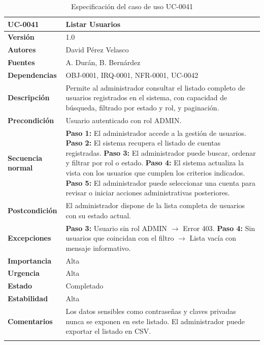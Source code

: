 \documentclass[11pt, a4paper]{article}
\begin{document}
\begin{longtable}{|p{4cm}|p{10cm}|}
\hline
\textbf{UC-0041} & Listar Usuarios \\
\hline
\textbf{Versión} & 1.0 \\
\hline
\textbf{Autores} & David Pérez Velasco \\
\hline
\textbf{Fuentes} & A. Durán, B. Bernárdez \\
\hline
\textbf{Dependencias} & OBJ-0001, IRQ-0001, NFR-0001, UC-0042 \\
\hline
\textbf{Descripción} & Permite al administrador consultar el listado completo de usuarios registrados en el sistema, con capacidad de búsqueda, filtrado por estado y rol, y paginación. \\
\hline
\textbf{Precondición} & Usuario autenticado con rol ADMIN. \\
\hline
\textbf{Secuencia normal} &
\textbf{Paso 1:} El administrador accede a la gestión de usuarios.\newline
\textbf{Paso 2:} El sistema recupera el listado de cuentas registradas.\newline
\textbf{Paso 3:} El administrador puede buscar, ordenar y filtrar por rol o estado.\newline
\textbf{Paso 4:} El sistema actualiza la vista con los usuarios que cumplen los criterios indicados.\newline
\textbf{Paso 5:} El administrador puede seleccionar una cuenta para revisar o iniciar acciones administrativas posteriores.\\
\hline
\textbf{Postcondición} & El administrador dispone de la lista completa de usuarios con su estado actual. \\
\hline
\textbf{Excepciones} &
\textbf{Paso 3:} Usuario sin rol ADMIN $\rightarrow$ Error 403.\newline
\textbf{Paso 4:} Sin usuarios que coincidan con el filtro $\rightarrow$ Lista vacía con mensaje informativo.\\
\hline
\textbf{Importancia} & Alta \\
\hline
\textbf{Urgencia} & Alta \\
\hline
\textbf{Estado} & Completado \\
\hline
\textbf{Estabilidad} & Alta \\
\hline
\textbf{Comentarios} & Los datos sensibles como contraseñas y claves privadas nunca se exponen en este listado. El administrador puede exportar el listado en CSV. \\
\hline
\caption{Especificación del caso de uso UC-0041}
\end{longtable}
\end{document}
